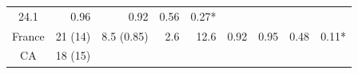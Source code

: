 \begin{longtable}[]{@{}crrrrllrl@{}}
\begin{minipage}[t]{0.05\columnwidth}
24.1\strut
\end{minipage} & \begin{minipage}[t]{0.11\columnwidth}\raggedright\strut
0.96\strut
\end{minipage} & \begin{minipage}[t]{0.06\columnwidth}\raggedright\strut
0.92\strut
\end{minipage} & \begin{minipage}[t]{0.06\columnwidth}\raggedleft\strut
0.56\strut
\end{minipage} & \begin{minipage}[t]{0.07\columnwidth}\raggedright\strut
0.27*\strut
\end{minipage}\tabularnewline
\begin{minipage}[t]{0.12\columnwidth}\centering\strut
France\strut
\end{minipage} & \begin{minipage}[t]{0.08\columnwidth}\raggedleft\strut
21 (14)\strut
\end{minipage} & \begin{minipage}[t]{0.13\columnwidth}\raggedleft\strut
8.5 (0.85)\strut
\end{minipage} & \begin{minipage}[t]{0.04\columnwidth}\raggedleft\strut
2.6\strut
\end{minipage} & \begin{minipage}[t]{0.05\columnwidth}\raggedleft\strut
12.6\strut
\end{minipage} & \begin{minipage}[t]{0.11\columnwidth}\raggedright\strut
0.92\strut
\end{minipage} & \begin{minipage}[t]{0.06\columnwidth}\raggedright\strut
0.95\strut
\end{minipage} & \begin{minipage}[t]{0.06\columnwidth}\raggedleft\strut
0.48\strut
\end{minipage} & \begin{minipage}[t]{0.07\columnwidth}\raggedright\strut
0.11*\strut
\end{minipage}\tabularnewline
\begin{minipage}[t]{0.12\columnwidth}\centering\strut
CA\strut
\end{minipage} & \begin{minipage}[t]{0.08\columnwidth}\raggedleft\strut
18 (15)\strut
\end{minipage} & \begin{minipage}[t]{0.13\columnwidth}\raggedleft\strut

\end{minipage}
\end{longtable}
